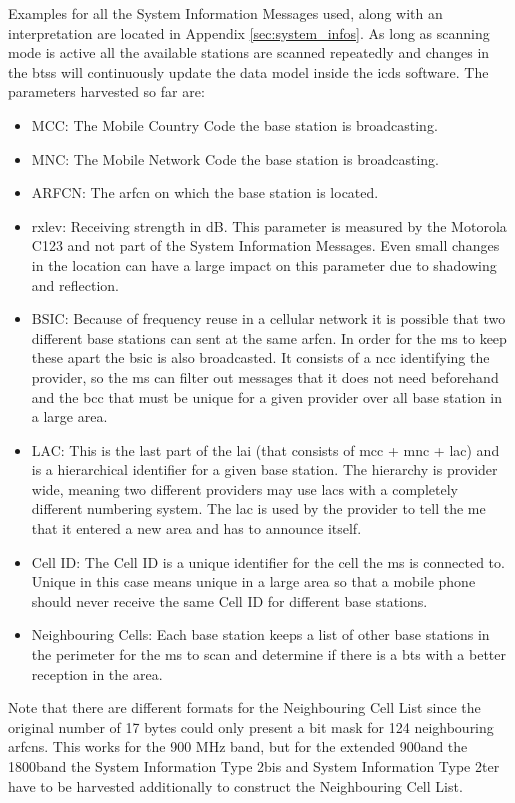 Examples for all the System Information Messages used, along with an interpretation are located in Appendix \ref{sec:system_infos}.
As long as scanning mode is active all the available stations are scanned repeatedly and changes in the \glspl{bts} will continuously update the data model inside the \gls{icds} software.
The parameters harvested so far are:
\begin{itemize}
	\item MCC: The Mobile Country Code the base station is broadcasting.
	\item MNC: The Mobile Network Code the base station is broadcasting.
	\item ARFCN: The \gls{arfcn} on which the base station is located.
	\item rxlev: Receiving strength in dB.
	This parameter is measured by the Motorola C123 and not part of the System Information Messages.
	Even small changes in the location can have a large impact on this parameter due to shadowing and reflection.
	\item BSIC: Because of frequency reuse in a cellular network it is possible that two different base stations can sent at the same \gls{arfcn}.
	In order for the \gls{ms} to keep these apart the \gls{bsic} is also broadcasted.
	It consists of a \gls{ncc} identifying the provider, so the \gls{ms} can filter out messages that it does not need beforehand and the \gls{bcc} that must be unique for a given provider over all base station in a large area.
	\item LAC: This is the last part of the \gls{lai} (that consists of \gls{mcc} + \gls{mnc} + \gls{lac}) and is a hierarchical identifier for a given base station.
	The hierarchy is provider wide, meaning two different providers may use \glspl{lac} with a completely different numbering system.
	The \gls{lac} is used by the provider to tell the \gls{me} that it entered a new area and has to announce itself.
	\item Cell ID: The Cell ID is a unique identifier for the cell the \gls{ms} is connected to.
	Unique in this case means unique in a large area so that a mobile phone should never receive the same Cell ID for different base stations. 
	\item Neighbouring Cells: Each base station keeps a list of other base stations in the perimeter  for the \gls{ms} to scan and determine if there is a \gls{bts} with a better reception in the area.
\end{itemize}
Note that there are different formats for the Neighbouring Cell List since the original number of 17 bytes could only present a bit mask for 124 neighbouring \glspl{arfcn}.
This works for the 900 MHz band, but for the extended 900\MHz and the 1800\MHz band the System Information Type 2bis and System Information Type 2ter have to be harvested additionally to construct the Neighbouring Cell List.

